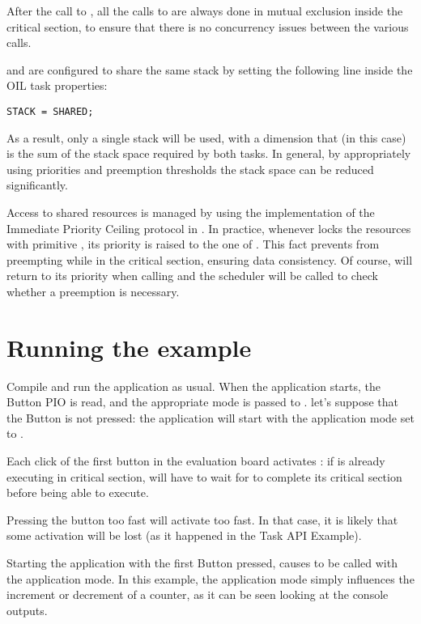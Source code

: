 After the call to , all the calls to  are
always done in mutual exclusion inside the  critical
section, to ensure that there is no concurrency issues between the
various  calls.

 and  are configured to share the same stack
by setting the following line inside the OIL task properties:
\begin{lstlisting}
STACK = SHARED;
\end{lstlisting}
As a result, only a single stack will be used, with a dimension that
(in this case) is the sum of the stack space required by both
tasks. In general, by appropriately using priorities and preemption
thresholds the stack space can be reduced significantly.

Access to shared resources is managed by using the implementation of
the Immediate Priority Ceiling protocol in \ee. 
%
%
In practice, whenever  locks the resources with primitive
, its priority is raised to the one of
. This fact prevents  from preempting
 while in the critical section, ensuring data consistency.
Of course,  will return to its priority when calling
 and the scheduler will be called to check
whether a preemption is necessary.
 
\section{Running the example}
Compile and run the application as usual. When the application starts,
the Button PIO is read, and the appropriate mode is passed to
. let's suppose that the Button is not pressed: the
application will start with the application mode set to
.

Each click of the first button in the evaluation board activates
: if  is already executing in critical
section,  will have to wait for  to complete
its critical section before being able to execute.

Pressing the button too fast will activate  too fast. In
that case, it is likely that some activation will be lost (as it
happened in the Task API Example).
  
Starting the application with the first Button pressed, causes
 to be called with the  application
mode. In this example, the application mode simply influences the
increment or decrement of a counter, as it can be seen looking at the
console outputs.
